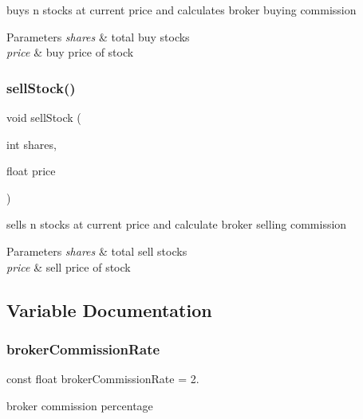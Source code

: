 buys n stocks at current price and calculates broker buying commission 


\begin{DoxyParams}{Parameters}
{\em shares} & total buy stocks \\
\hline
{\em price} & buy price of stock \\
\hline
\end{DoxyParams}
\mbox{\label{3-stock-trading_8c_ac8a01919e783f59209e9af0215300601}} 
\subsubsection{\texorpdfstring{sellStock()}{sellStock()}}
{\footnotesize\ttfamily void sell\+Stock (\begin{DoxyParamCaption}\item[{int}]{shares,  }\item[{float}]{price }\end{DoxyParamCaption})}



sells n stocks at current price and calculate broker selling commission 


\begin{DoxyParams}{Parameters}
{\em shares} & total sell stocks \\
\hline
{\em price} & sell price of stock \\
\hline
\end{DoxyParams}


\subsection{Variable Documentation}
\mbox{\label{3-stock-trading_8c_aac2ecb218f5356fcdeefb48d44b6ec59}} 
\subsubsection{\texorpdfstring{brokerCommissionRate}{brokerCommissionRate}}
{\footnotesize\ttfamily const float broker\+Commission\+Rate = 2.}

broker commission percentage 